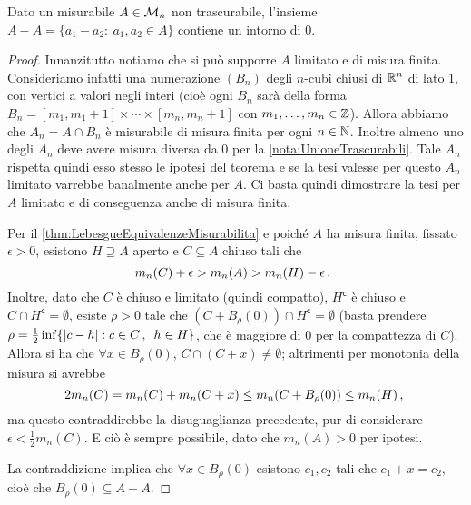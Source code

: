 \begin{theorem}[Steinhaus]\label{thm:Steinhaus}
	Dato un misurabile $A\in\mathcal M_n$ non trascurabile, l'insieme $A-A=\{a_1-a_2:\ a_1,a_2\in A\}$ contiene un intorno di $0$.
\end{theorem}
\begin{proof}
	Innanzitutto notiamo che si può supporre $A$ limitato e di misura finita. Consideriamo infatti una numerazione $(B_n)$ degli $n$-cubi chiusi di $\mathbb R^n$ di lato 1, con vertici a valori negli interi (cioè ogni $B_n$ sarà della forma $B_n=[m_1,m_1+1]\times\cdots\times[m_n,m_n+1]$ con $m_1,\dots,m_n\in\mathbb Z$). Allora abbiamo che $A_n=A\cap B_n$ è misurabile di misura finita per ogni $n\in\mathbb N$. Inoltre almeno uno degli $A_n$ deve avere misura diversa da 0 per la \cref{nota:UnioneTrascurabili}. Tale $A_n$ rispetta quindi esso stesso le ipotesi del teorema e se la tesi valesse per questo $A_n$ limitato varrebbe banalmente anche per $A$. Ci basta quindi dimostrare la tesi per $A$ limitato e di conseguenza anche di misura finita.
	
	Per il \cref{thm:LebesgueEquivalenzeMisurabilita} e poiché $A$ ha misura finita, fissato $\epsilon>0$, esistono $H\supseteq A$ aperto e $C\subseteq A$ chiuso tali che
	\[
		m_n(C)+\epsilon > m_n(A) > m_n(H)-\epsilon\, \text{. }
	\]
	Inoltre, dato che $C$ è chiuso e limitato (quindi compatto), $H^\mathsf{c}$ è chiuso e $C \cap H^\mathsf{c} = \emptyset$, esiste $\rho>0$ tale che
	$(C+B_{\rho}(0)) \cap H^\mathsf{c} = \emptyset$ (basta prendere $\rho = \frac{1}{2}\inf\{|c-h|:c\in C\, \text{, }\ h\in H\}$, che è maggiore di 0 per la compattezza di $C$).
	Allora si ha che $\forall x\in B_{\rho}(0)$, $C \cap (C+x) \neq \emptyset$; altrimenti per monotonia della misura si avrebbe
	\[
		2m_n(C) = m_n(C)+m_n(C+x) \leq m_n(C+B_{\rho}(0)) \leq m_n(H)\, \text{, }
	\]
	ma questo contraddirebbe la disuguaglianza precedente, pur di considerare $\epsilon< \frac{1}{2}m_n(C)$. E ciò è sempre possibile, dato che
	$m_n(A) > 0$ per ipotesi.
	
	La contraddizione implica che $\forall x\in B_{\rho}(0)$ esistono $c_1,c_2$ tali che $c_1+x=c_2$, cioè che $B_{\rho}(0) \subseteq A-A$.
\end{proof}


